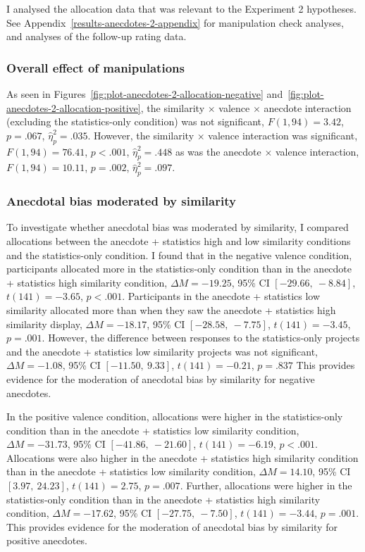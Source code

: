 \documentclass[a4paper, nobind, dvipsnames]{templates/ociamthesis}
\theoremstyle{definition}
\theoremstyle{definition}
\theoremstyle{definition}
\theoremstyle{definition}
\theoremstyle{remark}
\begin{document}
I analysed the allocation data that was relevant to the Experiment 2 hypotheses.
See Appendix~\ref{results-anecdotes-2-appendix} for manipulation check
analyses, and analyses of the follow-up rating data.

\subsubsection{Overall effect of manipulations}

As seen in Figures~\ref{fig:plot-anecdotes-2-allocation-negative}
and~\ref{fig:plot-anecdotes-2-allocation-positive}, the similarity \(\times\)
valence \(\times\) anecdote interaction (excluding the statistics-only condition)
was not significant,
\(F(1, 94) = 3.42\), \(p = .067\), \(\hat{\eta}^2_p = .035\).
However, the similarity \(\times\) valence interaction was significant,
\(F(1, 94) = 76.41\), \(p < .001\), \(\hat{\eta}^2_p = .448\) as was the anecdote \(\times\) valence
interaction, \(F(1, 94) = 10.11\), \(p = .002\), \(\hat{\eta}^2_p = .097\).

\subsubsection{Anecdotal bias moderated by similarity}

To investigate whether anecdotal bias was moderated by similarity, I compared
allocations between the anecdote + statistics high and low similarity conditions and the
statistics-only condition. I found that in the negative valence condition,
participants allocated more in the statistics-only condition than in the
anecdote + statistics high similarity condition,
\(\Delta M = -19.25\), 95\% CI \([-29.66,~-8.84]\), \(t(141) = -3.65\), \(p < .001\).
Participants in the anecdote + statistics low similarity allocated more than when they saw
the anecdote + statistics high similarity display,
\(\Delta M = -18.17\), 95\% CI \([-28.58,~-7.75]\), \(t(141) = -3.45\), \(p = .001\).
However, the difference between responses to the statistics-only projects and
the anecdote + statistics low similarity projects was not significant,
\(\Delta M = -1.08\), 95\% CI \([-11.50,~9.33]\), \(t(141) = -0.21\), \(p = .837\)
This provides evidence for the moderation of anecdotal bias by similarity for
negative anecdotes.

In the positive valence condition, allocations were higher in the statistics-only
condition than in the anecdote + statistics low similarity condition,
\(\Delta M = -31.73\), 95\% CI \([-41.86,~-21.60]\), \(t(141) = -6.19\), \(p < .001\).
Allocations were also higher in the anecdote + statistics high similarity condition than in
the anecdote + statistics low similarity condition,
\(\Delta M = 14.10\), 95\% CI \([3.97,~24.23]\), \(t(141) = 2.75\), \(p = .007\).
Further, allocations were higher in the statistics-only condition than in the
anecdote + statistics high similarity condition,
\(\Delta M = -17.62\), 95\% CI \([-27.75,~-7.50]\), \(t(141) = -3.44\), \(p = .001\).
This provides evidence for the moderation of anecdotal bias by similarity for
positive anecdotes.
\end{document}
